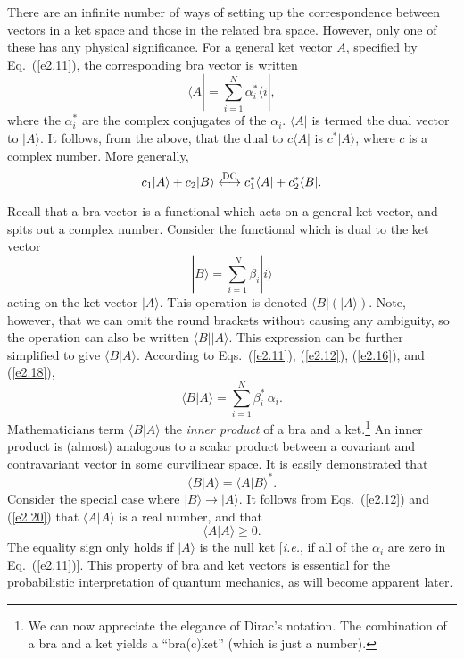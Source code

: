 There are an infinite number of ways of setting up the correspondence between
vectors in a ket space and those in the related bra space. However,
only one of these has any physical significance. For a general ket vector
$A$, specified by Eq.~(\ref{e2.11}), the corresponding bra vector is written
\begin{equation}\label{e2.16}
\langle A| = \sum_{i=1}^N \alpha_i^\ast \langle i|,
\end{equation}
where the $\alpha_i^\ast$ are the complex conjugates of the $\alpha_i$.
$\langle A|$ is termed the dual vector to $|A\rangle$. It follows, from the
above, that the dual to $c \langle A|$ is $c^\ast |A \rangle$, where $c$ is
a complex number. More generally,
\begin{equation}
c_1 |A\rangle + c_2 |B\rangle \stackrel{\rm DC}{\longleftrightarrow}
c_1^\ast \langle A| + c_2^\ast \langle B|.
\end{equation}

Recall that a bra vector is a functional which acts on a general ket vector,
and spits out a complex number. Consider the functional which is dual to the
ket vector 
\begin{equation}\label{e2.18}
|B\rangle = \sum_{i=1}^N \beta_i |i\rangle
\end{equation}
acting on the ket vector $|A\rangle$. This
operation is denoted $\langle B|(|A \rangle )$. Note, however, that 
we can omit the round brackets without causing any ambiguity, so the
operation can also be written $\langle B||A \rangle$. This 
expression can be further simplified
 to give $\langle B|A \rangle$. According to Eqs.~(\ref{e2.11}), (\ref{e2.12}), (\ref{e2.16}), 
and (\ref{e2.18}),
\begin{equation}
\langle B|A \rangle = \sum_{i=1}^N \beta_i^\ast \,\alpha_i.
\end{equation}
Mathematicians term $\langle B|A \rangle$ 
 the {\em inner product} of a bra and a ket.\footnote{We 
can now appreciate the elegance of Dirac's 
notation. The combination of a bra and a ket yields a ``bra(c)ket'' (which is
just a number).}
 An inner product is (almost) analogous to a
scalar product between a covariant and contravariant vector in 
some curvilinear space.
It is easily demonstrated that
\begin{equation}\label{e2.20}
\langle B|A \rangle = \langle A|B \rangle^\ast.
\end{equation}
Consider the special case where $|B\rangle \rightarrow |A \rangle$. It
follows from Eqs.~(\ref{e2.12}) and (\ref{e2.20}) 
that $\langle A|A\rangle$ is a real number, and that
\begin{equation}\label{e2.21}
\langle A|A \rangle \geq 0.
\end{equation}
The equality sign only holds if $|A\rangle$ is the null ket [{\em i.e.}, if
all of the $\alpha_i$ are zero in Eq.~(\ref{e2.11})]. This property of bra and ket
vectors is essential for the probabilistic interpretation of quantum mechanics,
as will become apparent later. 

